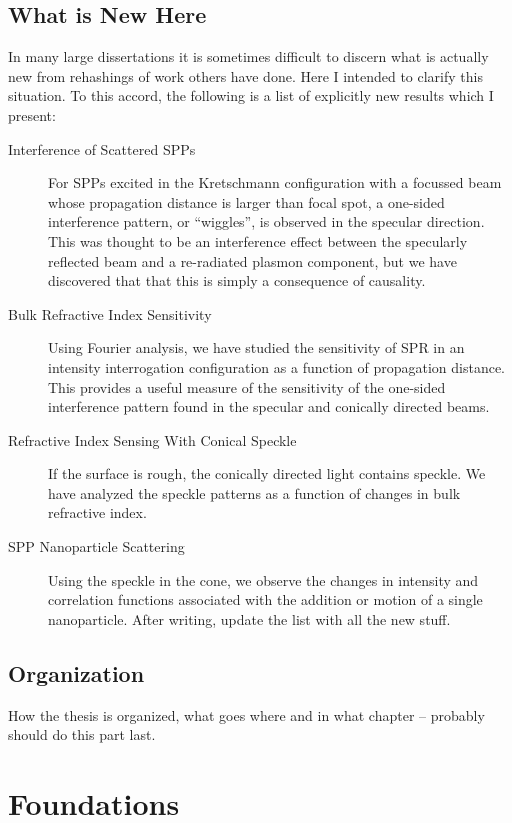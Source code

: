 \documentclass[a4paper,titlepage,onecolumn]{report}
\begin{document}
\section{What is New Here}
In many large dissertations it is sometimes difficult to discern what is
actually new from rehashings of work others have done.  Here I intended to
clarify this situation.  To this accord, the following is a list of
explicitly new results which I present:

\begin{description}
\item[{Interference of Scattered SPPs}]
For SPPs excited in the Kretschmann configuration with a focussed beam
whose propagation distance is larger than focal spot, a one-sided
interference pattern, or ``wiggles'', is observed in the specular direction.  This was
thought to be an interference effect between the specularly reflected beam
and a re-radiated plasmon component, but we have discovered that that this is
simply a consequence of causality.
\item[{Bulk Refractive Index Sensitivity}] 
Using Fourier analysis, we have studied the sensitivity of SPR in an intensity
interrogation configuration as a function of propagation distance.  This
provides a useful measure of the sensitivity of the one-sided interference
pattern found in the specular and conically directed beams.
\item[{Refractive Index Sensing With Conical Speckle}]
If the surface is rough, the conically directed light contains speckle.  We
have analyzed the speckle patterns as a function of changes in bulk
refractive index.
\item[{SPP Nanoparticle Scattering}]
Using the speckle in the cone, we observe the changes in intensity and
correlation functions associated with the addition or motion of a single
nanoparticle.
After writing, update the list with all the new stuff.
\end{description}

\section{Organization}
How the thesis is organized, what goes where and in what chapter
-- probably should do this part last.

\chapter{Foundations}
\end{document}
